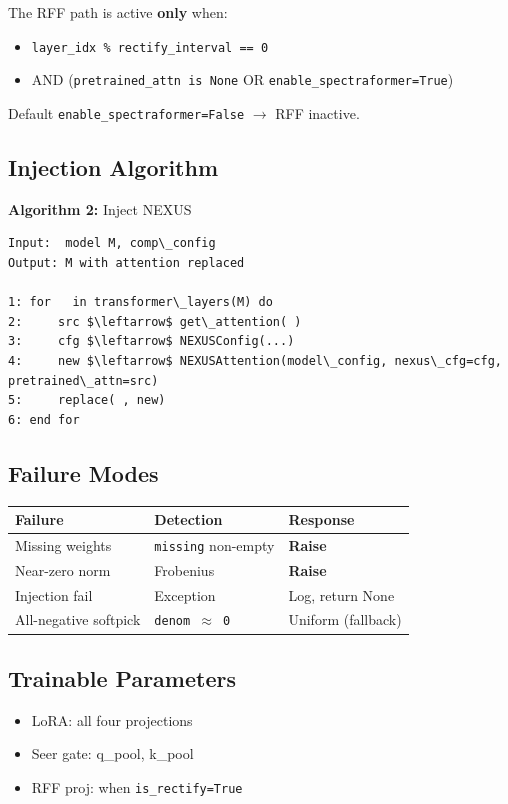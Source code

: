 The RFF path is active \textbf{only} when:
\begin{itemize}
\item \texttt{layer\_idx \% rectify\_interval == 0}
\item AND (\texttt{pretrained\_attn is None} OR \texttt{enable\_spectraformer=True})

\end{itemize}
Default \texttt{enable\_spectraformer=False} $\to$ RFF inactive.

\subsection{Injection Algorithm}

\textbf{Algorithm 2:} Inject NEXUS
\begin{lstlisting}
Input:  model M, comp\_config
Output: M with attention replaced

1: for   in transformer\_layers(M) do
2:     src $\leftarrow$ get\_attention( )
3:     cfg $\leftarrow$ NEXUSConfig(...)
4:     new $\leftarrow$ NEXUSAttention(model\_config, nexus\_cfg=cfg, pretrained\_attn=src)
5:     replace( , new)
6: end for
\end{lstlisting}

\subsection{Failure Modes}

\begin{table}[H]
\centering
\small
\begin{tabular}{lll}
\toprule
\textbf{Failure} & \textbf{Detection} & \textbf{Response} \\
\midrule
Missing weights & \texttt{missing} non-empty & \textbf{Raise} \\
Near-zero norm & Frobenius & \textbf{Raise} \\
Injection fail & Exception & Log, return None \\
All-negative softpick & \texttt{denom $\approx$ 0} & Uniform (fallback) \\
\bottomrule
\end{tabular}
\end{table}

\subsection{Trainable Parameters}

\begin{itemize}
\item LoRA: all four projections
\item Seer gate: q\_pool, k\_pool
\item RFF proj: when \texttt{is\_rectify=True}

\end{itemize}
